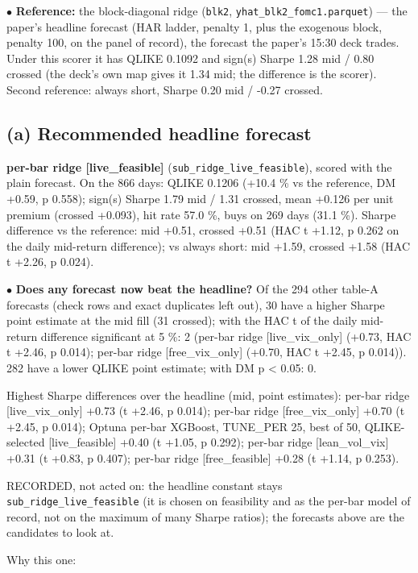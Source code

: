 \documentclass[10pt]{article}
\begin{document}
$\bullet$ \textbf{Reference:} the block-diagonal ridge (\texttt{blk2}, \texttt{yhat\_blk2\_fomc1.parquet}) --- the paper's headline forecast (HAR ladder, penalty 1, plus the exogenous block, penalty 100, on the panel of record), the forecast the paper's 15:30 deck trades. Under this scorer it has QLIKE 0.1092 and sign(s) Sharpe 1.28 mid /\allowbreak{} 0.80 crossed (the deck's own map gives it 1.34 mid; the difference is the scorer). Second reference: always short, Sharpe 0.20 mid /\allowbreak{} -0.27 crossed.\par
\subsection*{(a) Recommended headline forecast}
\textbf{per-bar ridge [live\_feasible]} (\texttt{sub\_ridge\_live\_feasible}), scored with the plain forecast. On the 866 days: QLIKE 0.1206 (+10.4 \% vs the reference, DM +0.59, p 0.558); sign(s) Sharpe 1.79 mid /\allowbreak{} 1.31 crossed, mean +0.126 per unit premium (crossed +0.093), hit rate 57.0 \%, buys on 269 days (31.1 \%). Sharpe difference vs the reference: mid +0.51, crossed +0.51 (HAC t +1.12, p 0.262 on the daily mid-return difference); vs always short: mid +1.59, crossed +1.58 (HAC t +2.26, p 0.024).\par
$\bullet$ \textbf{Does any forecast now beat the headline?} Of the 294 other table-A forecasts (check rows and exact duplicates left out), 30 have a higher Sharpe point estimate at the mid fill (31 crossed); with the HAC t of the daily mid-return difference significant at 5 \%: 2 (per-bar ridge [live\_vix\_only] (+0.73, HAC t +2.46, p 0.014); per-bar ridge [free\_vix\_only] (+0.70, HAC t +2.45, p 0.014)). 282 have a lower QLIKE point estimate; with DM p < 0.05: 0.\par
Highest Sharpe differences over the headline (mid, point estimates): per-bar ridge [live\_vix\_only] +0.73 (t +2.46, p 0.014); per-bar ridge [free\_vix\_only] +0.70 (t +2.45, p 0.014); Optuna per-bar XGBoost, TUNE\_PER 25, best of 50, QLIKE-selected [live\_feasible] +0.40 (t +1.05, p 0.292); per-bar ridge [lean\_vol\_vix] +0.31 (t +0.83, p 0.407); per-bar ridge [free\_feasible] +0.28 (t +1.14, p 0.253).\par
RECORDED, not acted on: the headline constant stays \texttt{sub\_ridge\_live\_feasible} (it is chosen on feasibility and as the per-bar model of record, not on the maximum of many Sharpe ratios); the forecasts above are the candidates to look at.\par
Why this one:\par
\end{document}
